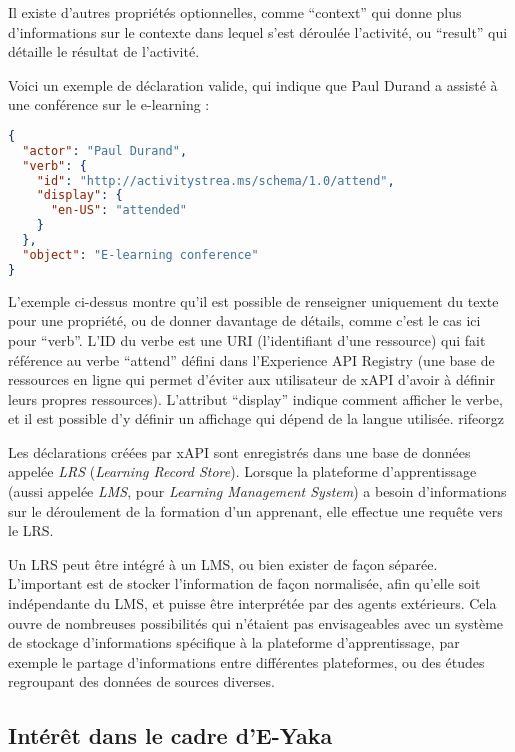             \let\myitem\relax

            Il existe d’autres propriétés optionnelles, comme \enquote{context} qui donne plus d’informations sur le contexte dans lequel s’est déroulée l’activité, ou \enquote{result} qui détaille le résultat de l’activité.

            Voici un exemple de déclaration valide, qui indique que Paul Durand a assisté à une conférence sur le e-learning :

\begin{lstlisting}[language=json, numbers=none]
{
  "actor": "Paul Durand",
  "verb": {
    "id": "http://activitystrea.ms/schema/1.0/attend",
    "display": { 
      "en-US": "attended" 
    }
  },
  "object": "E-learning conference"
}
\end{lstlisting}

            L’exemple ci-dessus montre qu’il est possible de renseigner uniquement du texte pour une propriété, ou de donner davantage de détails, comme c’est le cas ici pour \enquote{verb}. L’ID du verbe est une URI (l’identifiant d’une ressource) qui fait référence au verbe \enquote{attend} défini dans l’Experience API Registry (une base de ressources en ligne qui permet d’éviter aux utilisateur de xAPI d’avoir à définir leurs propres ressources). L’attribut \enquote{display} indique comment afficher le verbe, et il est possible d’y définir un affichage qui dépend de la langue utilisée. rifeorgz

            Les déclarations créées par xAPI sont enregistrés dans une base de données appelée \emph{LRS} (\emph{Learning Record Store}). Lorsque la plateforme d’apprentissage (aussi appelée \emph{LMS}, pour \emph{Learning Management System}) a besoin d’informations sur le déroulement de la formation d’un apprenant, elle effectue une requête vers le LRS.

            Un LRS peut être intégré à un LMS, ou bien exister de façon séparée. L’important est de stocker l’information de façon normalisée, afin qu’elle soit indépendante du LMS, et puisse être interprétée par des agents extérieurs. Cela ouvre de nombreuses possibilités qui n’étaient pas envisageables avec un système de stockage d’informations spécifique à la plateforme d’apprentissage, par exemple le partage d’informations entre différentes plateformes, ou des études regroupant des données de sources diverses.

        \subsection{Intérêt dans le cadre d’E-Yaka}

